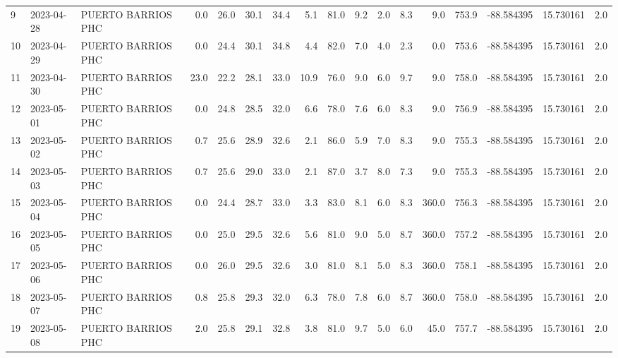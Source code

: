 \documentclass[12pt]{article}
\begin{document}
\begin{center}
\begin{tabular}{lllrrrrrrrrrrrrrr}
9   & 2023-04-28 &  PUERTO BARRIOS PHC &     0.0 &  26.0 &   30.1 &  34.4 &      5.1 &     81.0 &        9.2 &  2.0 &         8.3 &         9.0 &      753.9 & -88.584395 &  15.730161 &      2.0 \\
10  & 2023-04-29 &  PUERTO BARRIOS PHC &     0.0 &  24.4 &   30.1 &  34.8 &      4.4 &     82.0 &        7.0 &  4.0 &         2.3 &         0.0 &      753.6 & -88.584395 &  15.730161 &      2.0 \\
11  & 2023-04-30 &  PUERTO BARRIOS PHC &    23.0 &  22.2 &   28.1 &  33.0 &     10.9 &     76.0 &        9.0 &  6.0 &         9.7 &         9.0 &      758.0 & -88.584395 &  15.730161 &      2.0 \\
12  & 2023-05-01 &  PUERTO BARRIOS PHC &     0.0 &  24.8 &   28.5 &  32.0 &      6.6 &     78.0 &        7.6 &  6.0 &         8.3 &         9.0 &      756.9 & -88.584395 &  15.730161 &      2.0 \\
13  & 2023-05-02 &  PUERTO BARRIOS PHC &     0.7 &  25.6 &   28.9 &  32.6 &      2.1 &     86.0 &        5.9 &  7.0 &         8.3 &         9.0 &      755.3 & -88.584395 &  15.730161 &      2.0 \\
14  & 2023-05-03 &  PUERTO BARRIOS PHC &     0.7 &  25.6 &   29.0 &  33.0 &      2.1 &     87.0 &        3.7 &  8.0 &         7.3 &         9.0 &      755.3 & -88.584395 &  15.730161 &      2.0 \\
15  & 2023-05-04 &  PUERTO BARRIOS PHC &     0.0 &  24.4 &   28.7 &  33.0 &      3.3 &     83.0 &        8.1 &  6.0 &         8.3 &       360.0 &      756.3 & -88.584395 &  15.730161 &      2.0 \\
16  & 2023-05-05 &  PUERTO BARRIOS PHC &     0.0 &  25.0 &   29.5 &  32.6 &      5.6 &     81.0 &        9.0 &  5.0 &         8.7 &       360.0 &      757.2 & -88.584395 &  15.730161 &      2.0 \\
17  & 2023-05-06 &  PUERTO BARRIOS PHC &     0.0 &  26.0 &   29.5 &  32.6 &      3.0 &     81.0 &        8.1 &  5.0 &         8.3 &       360.0 &      758.1 & -88.584395 &  15.730161 &      2.0 \\
18  & 2023-05-07 &  PUERTO BARRIOS PHC &     0.8 &  25.8 &   29.3 &  32.0 &      6.3 &     78.0 &        7.8 &  6.0 &         8.7 &       360.0 &      758.0 & -88.584395 &  15.730161 &      2.0 \\
19  & 2023-05-08 &  PUERTO BARRIOS PHC &     2.0 &  25.8 &   29.1 &  32.8 &      3.8 &     81.0 &        9.7 &  5.0 &         6.0 &        45.0 &      757.7 & -88.584395 &  15.730161 &      2.0 \\

\end{tabular}
\end{center}
\end{document}
